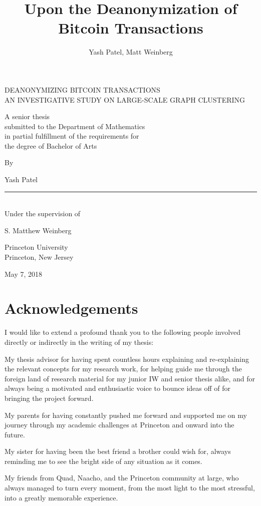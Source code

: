 \documentclass{article}
\begin{document}
\title{Upon the Deanonymization of Bitcoin Transactions}
\author{Yash Patel, Matt Weinberg}

\begin{center}
\thispagestyle{empty}
\parskip=14pt%
\vspace*{3\parskip}%
\LARGE{DEANONYMIZING BITCOIN TRANSACTIONS} \\
\large{AN INVESTIGATIVE STUDY ON LARGE-SCALE GRAPH CLUSTERING}

\vspace*{3\parskip}%
\large{A senior thesis \\
submitted to the Department of Mathematics \\
in partial fulfillment of the requirements for \\
the degree of Bachelor of Arts}

\vspace*{2\parskip}%
By

Yash Patel

\rule{7cm}{0.4pt}\\
Under the supervision of

S. Matthew Weinberg

Princeton University\\
Princeton, New Jersey

May 7, 2018
\end{center}
\clearpage

\doublespacing
\section*{Acknowledgements}
I would like to extend a profound thank you to the following people involved directly or indirectly in the writing of my thesis:

My thesis advisor for having spent countless hours explaining and re-explaining the relevant concepts for my research work, for helping guide me through the foreign land of research material for my junior IW and senior thesis alike, and for always being a motivated and enthusiastic voice to bounce ideas off of for bringing the project forward.

My parents for having constantly pushed me forward and supported me on my journey through my academic challenges at Princeton and onward into the future.

My sister for having been the best friend a brother could wish for, always reminding me to see the bright side of any situation as it comes. 

My friends from Quad, Naacho, and the Princeton community at large, who always managed to turn every moment, from the most light to the most stressful, into a greatly memorable experience.
\end{document}

